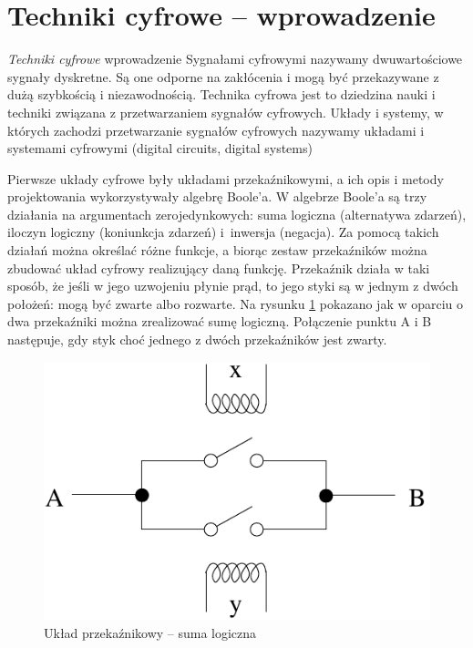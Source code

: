 \documentclass[a4paper,11pt]{article}
\begin{document}
 
\section*{Techniki cyfrowe -- wprowadzenie}

\textit{Techniki cyfrowe} wprowadzenie Sygnałami cyfrowymi nazywamy dwuwartościowe sygnały dyskretne. Są one odporne na zakłócenia i mogą być przekazywane z dużą szybkością i niezawodnością. Technika cyfrowa jest to dziedzina nauki i techniki związana z przetwarzaniem sygnałów cyfrowych. Układy i systemy, w których zachodzi przetwarzanie sygnałów cyfrowych nazywamy układami i systemami cyfrowymi (digital circuits, digital systems)

Pierwsze układy cyfrowe były układami przekaźnikowymi, a ich opis i metody projektowania wykorzystywały algebrę Boole'a. W algebrze Boole'a są trzy działania na argumentach zerojedynkowych: suma logiczna (alternatywa zdarzeń), iloczyn logiczny (koniunkcja zdarzeń) i~inwersja (negacja). Za pomocą takich działań można określać różne funkcje, a biorąc zestaw przekaźników można zbudować układ cyfrowy realizujący daną funkcję. Przekaźnik działa w taki sposób, że jeśli w jego uzwojeniu płynie prąd, to jego styki są w jednym z dwóch położeń: mogą być zwarte albo rozwarte. Na rysunku \ref{fig:ukladPrzekaznikowy} pokazano jak w oparciu o dwa przekaźniki można zrealizować sumę logiczną. Połączenie punktu A i B następuje, gdy styk choć jednego z dwóch przekaźników jest zwarty.

\begin{figure}[!htb]
\centerline{\includegraphics[scale=0.6]{uklad-przekaznikowy.pdf}}
\caption{Układ przekaźnikowy -- suma logiczna}
\label{fig:ukladPrzekaznikowy}
\end{figure}
\end{document}
